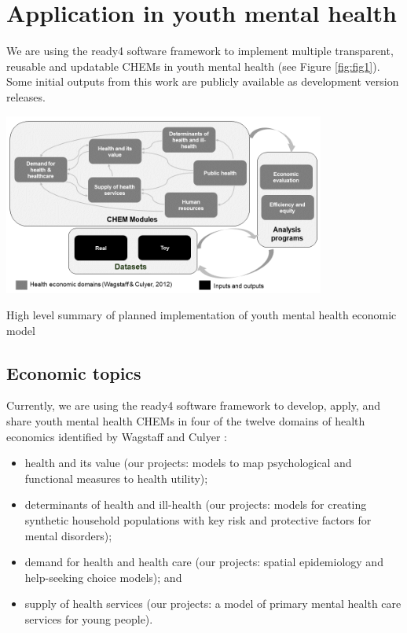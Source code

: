 \documentclass[sn-vancouver,Numbered,pdflatex]{sn-jnl}
\theoremstyle{remark}
\theoremstyle{definition}
\let\origfigure\figure
\begin{document}
\hypertarget{application-in-youth-mental-health}{%
\section{Application in youth mental health}\label{application-in-youth-mental-health}}

We are using the ready4 software framework to implement multiple transparent, reusable and updatable CHEMs in youth mental health (see Figure \ref{fig:fig1}). Some initial outputs from this work are publicly available as development version releases.

\bgroup 
    \origfigure[H]

\includegraphics[width=400px,]{Figure1} \caption{High level summary of planned implementation of youth mental health economic model}\label{fig:fig1}

    \endfigure
\egroup

\hypertarget{economic-topics}{%
\subsection{Economic topics}\label{economic-topics}}

Currently, we are using the ready4 software framework to develop, apply, and share youth mental health CHEMs in four of the twelve domains of health economics identified by Wagstaff and Culyer \citep{wagstaff2012four}:

\begin{itemize}
\item
  health and its value (our projects: models to map psychological and functional measures to health utility);
\item
  determinants of health and ill-health (our projects: models for creating synthetic household populations with key risk and protective factors for mental disorders);
\item
  demand for health and health care (our projects: spatial epidemiology and help-seeking choice models); and
\item
  supply of health services (our projects: a model of primary mental health care services for young people).
\end{itemize}
\end{document}

